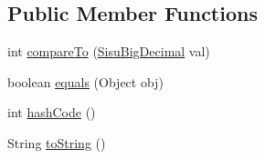 \subsection*{Public Member Functions}
\begin{DoxyCompactItemize}
\item 
int \hyperlink{classcom_1_1aarrelaakso_1_1drawl_1_1_sisu_big_decimal_a450f5da2c47612d8af98e59958ebccc6}{compare\+To} (\hyperlink{classcom_1_1aarrelaakso_1_1drawl_1_1_sisu_big_decimal}{Sisu\+Big\+Decimal} val)
\item 
boolean \hyperlink{classcom_1_1aarrelaakso_1_1drawl_1_1_sisu_big_decimal_ade8b690f00af26d67a84b812ad694f20}{equals} (Object obj)
\item 
int \hyperlink{classcom_1_1aarrelaakso_1_1drawl_1_1_sisu_big_decimal_a34555e12897a07cb48ac84a5b95f320a}{hash\+Code} ()
\item 
String \hyperlink{classcom_1_1aarrelaakso_1_1drawl_1_1_sisu_big_decimal_ac05b8909bde406486e3fb45e154c5ff4}{to\+String} ()
\end{DoxyCompactItemize}
